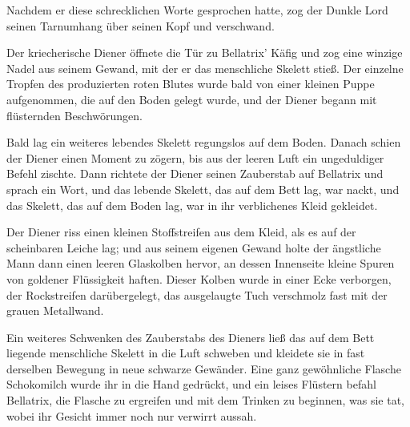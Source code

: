 Nachdem er diese schrecklichen Worte gesprochen hatte, zog der Dunkle Lord seinen Tarnumhang über seinen Kopf und verschwand.

Der kriecherische Diener öffnete die Tür zu Bellatrix' Käfig und zog eine winzige Nadel aus seinem Gewand, mit der er das menschliche Skelett stieß. Der einzelne Tropfen des produzierten roten Blutes wurde bald von einer kleinen Puppe aufgenommen, die auf den Boden gelegt wurde, und der Diener begann mit flüsternden Beschwörungen.

Bald lag ein weiteres lebendes Skelett regungslos auf dem Boden. Danach schien der Diener einen Moment zu zögern, bis aus der leeren Luft ein ungeduldiger Befehl zischte. Dann richtete der Diener seinen Zauberstab auf Bellatrix und sprach ein Wort, und das lebende Skelett, das auf dem Bett lag, war nackt, und das Skelett, das auf dem Boden lag, war in ihr verblichenes Kleid gekleidet.

Der Diener riss einen kleinen Stoffstreifen aus dem Kleid, als es auf der scheinbaren Leiche lag; und aus seinem eigenen Gewand holte der ängstliche Mann dann einen leeren Glaskolben hervor, an dessen Innenseite kleine Spuren von goldener Flüssigkeit haften. Dieser Kolben wurde in einer Ecke verborgen, der Rockstreifen darübergelegt, das ausgelaugte Tuch verschmolz fast mit der grauen Metallwand.

Ein weiteres Schwenken des Zauberstabs des Dieners ließ das auf dem Bett liegende menschliche Skelett in die Luft schweben und kleidete sie in fast derselben Bewegung in neue schwarze Gewänder. Eine ganz gewöhnliche Flasche Schokomilch wurde ihr in die Hand gedrückt, und ein leises Flüstern befahl Bellatrix, die Flasche zu ergreifen und mit dem Trinken zu beginnen, was sie tat, wobei ihr Gesicht immer noch nur verwirrt aussah.

